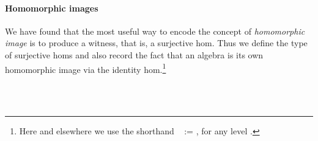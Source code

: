 \paragraph*{Homomorphic images}
We have found that the most useful way to encode the concept of \emph{homomorphic image}
is to produce a witness, that is, a surjective hom.  Thus we define the type of surjective homs
and also record the fact that an algebra is its own homomorphic image via the identity
hom.\footnote{Here and elsewhere we use the shorthand ~ := 
   , for any level .}

\ifshort\else
\begin{code}%
\>[0]\<%
\\
\>[0]\AgdaSpace{}%
\AgdaSymbol{:}\AgdaSpace{}%
\AgdaSpace{}%
\AgdaSpace{}%
\<%
\\
\>[0]\AgdaSpace{}%
\AgdaSpace{}%
\AgdaSymbol{=}\AgdaSpace{}%
\AgdaSpace{}%
\AgdaSpace{}%
\AgdaSpace{}%
\AgdaSpace{}%
\AgdaSpace{}%
\<%
\end{code}
\fi
